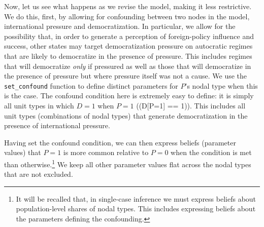 \documentclass[
  12pt,
]{book}
\begin{document}
Now, let us see what happens as we revise the model, making it less restrictive. We do this, first, by allowing for confounding between two nodes in the model, international pressure and democratization. In particular, we allow for the possibility that, in order to generate a perception of foreign-policy influence and success, other states may target democratization pressure on autocratic regimes that are likely to democratize in the presence of pressure. This includes regimes that will democratize \emph{only} if pressured as well as those that will democratize in the presence of pressure but where pressure itself was not a cause. We use the \texttt{set\_confound} function to define distinct parameters for \(P\)'s nodal type when this is the case. The confound condition here is extremely easy to define: it is simply all unit types in which \(D=1\) when \(P=1\) ((D{[}P=1{]} == 1)). This includes all unit types (combinations of nodal types) that generate democratization in the presence of international pressure.

Having set the confound condition, we can then express beliefs (parameter values) that \(P=1\) is more common relative to \(P=0\) when the condition is met than otherwise.\footnote{It will be recalled that, in single-case inference we must express beliefs about population-level shares of nodal types. This includes expressing beliefs about the parameters defining the confounding.} We keep all other parameter values flat across the nodal types that are not excluded.
\end{document}
